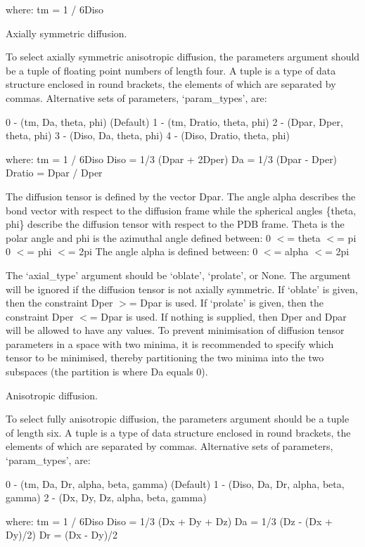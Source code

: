 where:
    tm = 1 / 6Diso


Axially symmetric diffusion.

To select axially symmetric anisotropic diffusion, the parameters argument should be a tuple
of floating point numbers of length four.  A tuple is a type of data structure enclosed in
round brackets, the elements of which are separated by commas.  Alternative sets of
parameters, `param\_types', are:

    0 - (tm, Da, theta, phi)   (Default)
    1 - (tm, Dratio, theta, phi)
    2 - (Dpar, Dper, theta, phi)
    3 - (Diso, Da, theta, phi)
    4 - (Diso, Dratio, theta, phi)

where:
    tm = 1 / 6Diso
    Diso = 1/3 (Dpar + 2Dper)
    Da = 1/3 (Dpar - Dper)
    Dratio = Dpar / Dper

The diffusion tensor is defined by the vector Dpar.  The angle alpha describes the bond
vector with respect to the diffusion frame while the spherical angles \{theta, phi\} describe
the diffusion tensor with respect to the PDB frame.  Theta is the polar angle and phi is the
azimuthal angle defined between:
    0 $<$= theta $<$= pi
    0 $<$= phi $<$= 2pi
The angle alpha is defined between:
    0 $<$= alpha $<$= 2pi

The `axial\_type' argument should be `oblate', `prolate', or None.  The argument will be
ignored if the diffusion tensor is not axially symmetric.  If `oblate' is given, then the
constraint Dper $>$= Dpar is used.  If `prolate' is given, then the constraint Dper $<$= Dpar is
used.  If nothing is supplied, then Dper and Dpar will be allowed to have any values.  To
prevent minimisation of diffusion tensor parameters in a space with two minima, it is
recommended to specify which tensor to be minimised, thereby partitioning the two minima
into the two subspaces (the partition is where Da equals 0).


Anisotropic diffusion.

To select fully anisotropic diffusion, the parameters argument should be a tuple of length
six.  A tuple is a type of data structure enclosed in round brackets, the elements of which
are separated by commas.  Alternative sets of parameters, `param\_types', are:

    0 - (tm, Da, Dr, alpha, beta, gamma)   (Default)
    1 - (Diso, Da, Dr, alpha, beta, gamma)
    2 - (Dx, Dy, Dz, alpha, beta, gamma)

where:
    tm = 1 / 6Diso
    Diso = 1/3 (Dx + Dy + Dz)
    Da = 1/3 (Dz - (Dx + Dy)/2)
    Dr = (Dx - Dy)/2

